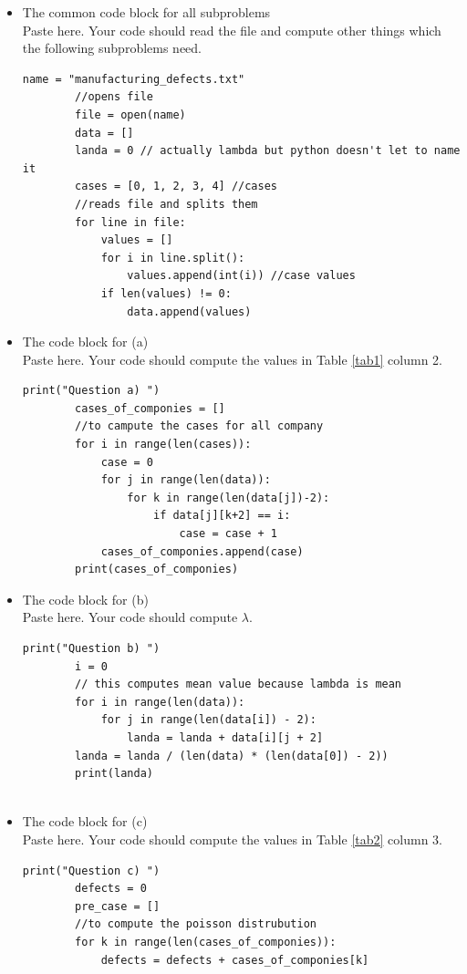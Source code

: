 \documentclass[a4 paper]{article}
\numberwithin{equation}{section}
\newcommand{\0}{\mathbf{0}}
\begin{document}
	\begin{itemize}
		\item The common code block for all subproblems\\
		Paste here. Your code should read the file and compute other things which the following subproblems need.
		
        \begin{lstlisting}[style=CStyle]
        name = "manufacturing_defects.txt"
        //opens file
        file = open(name)
        data = []
        landa = 0 // actually lambda but python doesn't let to name it
        cases = [0, 1, 2, 3, 4] //cases
        //reads file and splits them
        for line in file:
            values = []
            for i in line.split():
                values.append(int(i)) //case values
            if len(values) != 0:
                data.append(values)

        \end{lstlisting}
		
		\item The code block for (a)\\
		Paste here. Your code should compute the values in Table \ref{tab1} column 2.
		\begin{lstlisting}[style=CStyle]
		print("Question a) ")
        cases_of_componies = []
        //to campute the cases for all company
        for i in range(len(cases)):
            case = 0
            for j in range(len(data)):
                for k in range(len(data[j])-2):
                    if data[j][k+2] == i:
                        case = case + 1
            cases_of_componies.append(case)
        print(cases_of_componies)
		\end{lstlisting}
		\item The code block for (b)\\
		Paste here. Your code should compute $\lambda$.
		\begin{lstlisting}[style=CStyle]
		print("Question b) ")
        i = 0
        // this computes mean value because lambda is mean
        for i in range(len(data)):
            for j in range(len(data[i]) - 2):
                landa = landa + data[i][j + 2]
        landa = landa / (len(data) * (len(data[0]) - 2))
        print(landa)
    		
		\end{lstlisting}
		\item The code block for (c)\\
		Paste here. Your code should compute the values in
		Table \ref{tab2} column 3. 
		\begin{lstlisting}[style=CStyle]
		print("Question c) ")
        defects = 0
        pre_case = []
        //to compute the poisson distrubution
        for k in range(len(cases_of_componies)):
            defects = defects + cases_of_componies[k]
            

\end{lstlisting}
\end{itemize}
\end{document}
